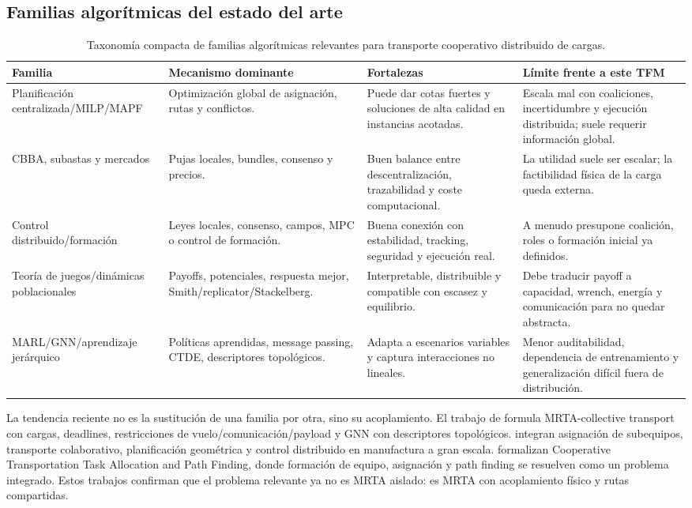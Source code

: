 \subsection{Familias algorítmicas del estado del arte}

\begin{table}[H]
\centering
\footnotesize
\begin{tabularx}{\textwidth}{p{2.85cm}Y Y Y}
\toprule
Familia & Mecanismo dominante & Fortalezas & Límite frente a este TFM \\
\midrule
Planificación centralizada/MILP/MAPF & Optimización global de asignación, rutas y conflictos. &
Puede dar cotas fuertes y soluciones de alta calidad en instancias acotadas. &
Escala mal con coaliciones, incertidumbre y ejecución distribuida; suele requerir información global. \\
CBBA, subastas y mercados & Pujas locales, bundles, consenso y precios. &
Buen balance entre descentralización, trazabilidad y coste computacional. &
La utilidad suele ser escalar; la factibilidad física de la carga queda externa. \\
Control distribuido/formación & Leyes locales, consenso, campos, MPC o control de formación. &
Buena conexión con estabilidad, tracking, seguridad y ejecución real. &
A menudo presupone coalición, roles o formación inicial ya definidos. \\
Teoría de juegos/dinámicas poblacionales & Payoffs, potenciales, respuesta mejor, Smith/replicator/Stackelberg. &
Interpretable, distribuible y compatible con escasez y equilibrio. &
Debe traducir payoff a capacidad, wrench, energía y comunicación para no quedar abstracta. \\
MARL/GNN/aprendizaje jerárquico & Políticas aprendidas, message passing, CTDE, descriptores topológicos. &
Adapta a escenarios variables y captura interacciones no lineales. &
Menor auditabilidad, dependencia de entrenamiento y generalización difícil fuera de distribución. \\
\bottomrule
\end{tabularx}
\caption{Taxonomía compacta de familias algorítmicas relevantes para transporte cooperativo distribuido de cargas.}
\label{tab:taxonomia_sota}
\end{table}

La tendencia reciente no es la sustitución de una familia por otra, sino su acoplamiento.
El trabajo de \citet{paul2023collective} formula MRTA-collective transport con cargas,
deadlines, restricciones de vuelo/comunicación/payload y GNN con descriptores
topológicos. \citet{brown2025assembly} integran asignación de subequipos, transporte
colaborativo, planificación geométrica y control distribuido en manufactura a gran
escala. \citet{zhou2026cttapf} formalizan Cooperative Transportation Task Allocation and
Path Finding, donde formación de equipo, asignación y path finding se resuelven como un
problema integrado. Estos trabajos confirman que el problema relevante ya no es MRTA
aislado: es MRTA con acoplamiento físico y rutas compartidas.

